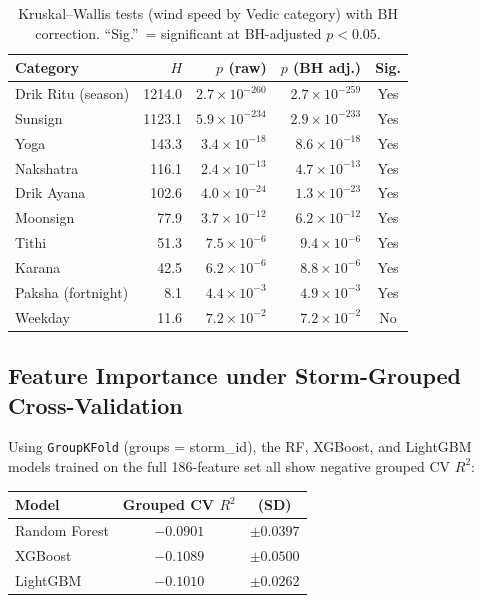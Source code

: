 \documentclass[12pt,a4paper]{article}
\begin{document}
\begin{table}[h]
\centering
\caption{Kruskal--Wallis tests (wind speed by Vedic category) with BH correction.
  ``Sig.''\ = significant at BH-adjusted $p < 0.05$.}
\label{tab:kw}
\begin{tabular}{lrrrc}
\toprule
\textbf{Category} & \textbf{$H$} & \textbf{$p$ (raw)} & \textbf{$p$ (BH adj.)} & \textbf{Sig.} \\
\midrule
Drik Ritu (season)   & 1214.0  & $2.7\times10^{-260}$ & $2.7\times10^{-259}$ & Yes \\
Sunsign              & 1123.1  & $5.9\times10^{-234}$ & $2.9\times10^{-233}$ & Yes \\
Yoga                 & 143.3   & $3.4\times10^{-18}$  & $8.6\times10^{-18}$  & Yes \\
Nakshatra            & 116.1   & $2.4\times10^{-13}$  & $4.7\times10^{-13}$  & Yes \\
Drik Ayana           & 102.6   & $4.0\times10^{-24}$  & $1.3\times10^{-23}$  & Yes \\
Moonsign             & 77.9    & $3.7\times10^{-12}$  & $6.2\times10^{-12}$  & Yes \\
Tithi                & 51.3    & $7.5\times10^{-6}$   & $9.4\times10^{-6}$   & Yes \\
Karana               & 42.5    & $6.2\times10^{-6}$   & $8.8\times10^{-6}$   & Yes \\
Paksha (fortnight)   & 8.1     & $4.4\times10^{-3}$   & $4.9\times10^{-3}$   & Yes \\
Weekday              & 11.6    & $7.2\times10^{-2}$   & $7.2\times10^{-2}$   & No  \\
\bottomrule
\end{tabular}
\end{table}

\subsection{Feature Importance under Storm-Grouped Cross-Validation}
\label{sec:importance}

Using \texttt{GroupKFold} (groups = storm\_id), the RF, XGBoost, and LightGBM models
trained on the full 186-feature set all show negative grouped CV $R^2$:

\begin{center}
\begin{tabular}{lcc}
\toprule
\textbf{Model} & \textbf{Grouped CV $R^2$} & \textbf{(SD)} \\
\midrule
Random Forest  & $-0.0901$ & $\pm 0.0397$ \\
XGBoost        & $-0.1089$ & $\pm 0.0500$ \\
LightGBM       & $-0.1010$ & $\pm 0.0262$ \\
\bottomrule
\end{tabular}
\end{center}
\end{document}
